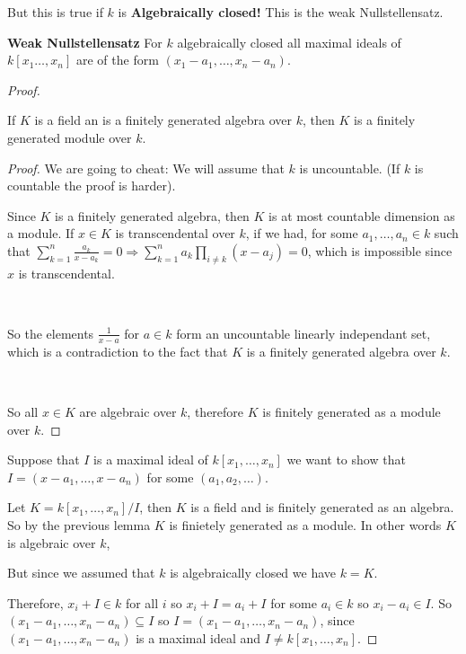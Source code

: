 But this is true if $k$ is \textbf{Algebraically closed!} This is the weak Nullstellensatz.

\begin{theorem} \textbf{Weak Nullstellensatz}
For $k$ algebraically closed all maximal ideals of $k[x_1\dots,x_n]$ are of the form $(x_1-a_1,\dots,x_n-a_n)$.
    \begin{proof}
        \begin{lemma}
            If $K$ is a field an is a finitely generated algebra over $k$, then $K$ is a finitely generated module over $k$.
            \begin{proof}
                We are going to cheat: We will assume that $k$ is uncountable. (If $k$ is countable the proof is harder).

                Since $K$ is a finitely generated algebra, then $K$ is at most countable dimension as a module. If $x\in K$ is transcendental over $k$, if we had, for some $a_1,\dots,a_n\in k$ such that  $\sum_{k=1}^n \frac{a_k}{x-a_k} = 0 \Rightarrow \sum_{k=1}^n a_k\prod_{i\neq k}(x-a_j) = 0$, which is impossible since $x$ is transcendental.
                
                \
                
                So the elements $\frac{1}{x-a}$ for $a\in k$ form an uncountable linearly independant set, which is a contradiction to the fact that $K$ is a finitely generated algebra over $k$.

                \

                So all $x\in K$ are algebraic over $k$, therefore $K$ is finitely generated as a module over $k$.
            \end{proof}
        \end{lemma}
        Suppose that $I$ is a maximal ideal of $k[x_1,\dots,x_n]$ we want to show that $I = (x-a_1,\dots,x-a_n)$ for some $(a_1,a_2,\dots)$.

        Let $K = k[x_1,\dots,x_n]/I$, then $K$ is a field and is finitely generated as an algebra. So by the previous lemma $K$ is finietely generated as a module. In other words $K$ is algebraic over $k$,

        But since we assumed that $k$ is algebraically closed we have $k=K$.

        Therefore, $x_i+I\in k$ for all $i$ so $x_i+I=a_i+I$ for some $a_i\in k$ so $x_i-a_i\in I$. So $(x_1-a_1,\dots,x_n-a_n)\subseteq I$ so $I = (x_1-a_1,\dots,x_n-a_n)$, since $(x_1-a_1,\dots,x_n-a_n)$ is a maximal ideal and $I\not=k[x_1,\dots,x_n]$.
    \end{proof}
\end{theorem}

